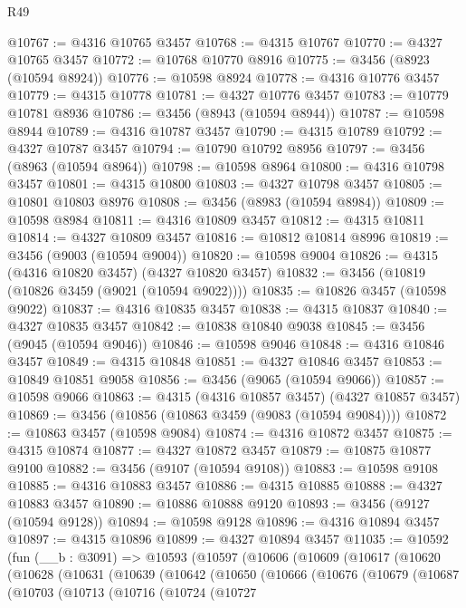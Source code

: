 \begin{lexlean}{R49}
\begin{coremodule}
@10767 := @4316 @10765 @3457
@10768 := @4315 @10767
@10770 := @4327 @10765 @3457
@10772 := @10768 @10770 @8916
@10775 := @3456 (@8923 (@10594 @8924))
@10776 := @10598 @8924
@10778 := @4316 @10776 @3457
@10779 := @4315 @10778
@10781 := @4327 @10776 @3457
@10783 := @10779 @10781 @8936
@10786 := @3456 (@8943 (@10594 @8944))
@10787 := @10598 @8944
@10789 := @4316 @10787 @3457
@10790 := @4315 @10789
@10792 := @4327 @10787 @3457
@10794 := @10790 @10792 @8956
@10797 := @3456 (@8963 (@10594 @8964))
@10798 := @10598 @8964
@10800 := @4316 @10798 @3457
@10801 := @4315 @10800
@10803 := @4327 @10798 @3457
@10805 := @10801 @10803 @8976
@10808 := @3456 (@8983 (@10594 @8984))
@10809 := @10598 @8984
@10811 := @4316 @10809 @3457
@10812 := @4315 @10811
@10814 := @4327 @10809 @3457
@10816 := @10812 @10814 @8996
@10819 := @3456 (@9003 (@10594 @9004))
@10820 := @10598 @9004
@10826 := @4315 (@4316 @10820 @3457) (@4327 @10820 @3457)
@10832 := @3456 (@10819 (@10826 @3459 (@9021 (@10594 @9022))))
@10835 := @10826 @3457 (@10598 @9022)
@10837 := @4316 @10835 @3457
@10838 := @4315 @10837
@10840 := @4327 @10835 @3457
@10842 := @10838 @10840 @9038
@10845 := @3456 (@9045 (@10594 @9046))
@10846 := @10598 @9046
@10848 := @4316 @10846 @3457
@10849 := @4315 @10848
@10851 := @4327 @10846 @3457
@10853 := @10849 @10851 @9058
@10856 := @3456 (@9065 (@10594 @9066))
@10857 := @10598 @9066
@10863 := @4315 (@4316 @10857 @3457) (@4327 @10857 @3457)
@10869 := @3456 (@10856 (@10863 @3459 (@9083 (@10594 @9084))))
@10872 := @10863 @3457 (@10598 @9084)
@10874 := @4316 @10872 @3457
@10875 := @4315 @10874
@10877 := @4327 @10872 @3457
@10879 := @10875 @10877 @9100
@10882 := @3456 (@9107 (@10594 @9108))
@10883 := @10598 @9108
@10885 := @4316 @10883 @3457
@10886 := @4315 @10885
@10888 := @4327 @10883 @3457
@10890 := @10886 @10888 @9120
@10893 := @3456 (@9127 (@10594 @9128))
@10894 := @10598 @9128
@10896 := @4316 @10894 @3457
@10897 := @4315 @10896
@10899 := @4327 @10894 @3457
@11035 := @10592
    (fun (__b : @3091) =>
    @10593
      (@10597
        (@10606
          (@10609
            (@10617
              (@10620
                (@10628
                  (@10631
                    (@10639
                      (@10642
                        (@10650
                          (@10666
                            (@10676
                              (@10679
                                (@10687
                                  (@10703
                                    (@10713
                                      (@10716
                                        (@10724
                                          (@10727

\end{coremodule}
\end{lexlean}
